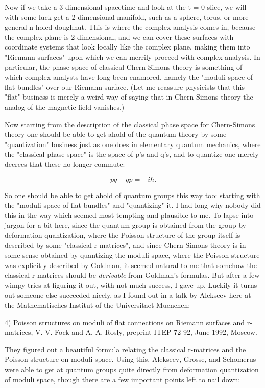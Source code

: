 Now if we take a 3-dimensional spacetime and look at the t = 0
slice, we will with some luck get a 2-dimensional manifold, such
as a sphere, torus, or more general n-holed doughnut.  This is where
the complex analysis comes in, because the complex plane is 2-dimensional,
and we can cover these surfaces with coordinate systems that look
locally like the complex plane, making them into "Riemann surfaces"
upon which we can merrily proceed with complex analysis.  In particular,
the phase space of classical Chern-Simons theory is something of
which complex analysts have long been enamored, namely the "moduli
space of flat bundles" over our Riemann surface.  (Let me reassure
physicists that this "flat" business is merely a weird way of saying
that in Chern-Simons theory the analog of the magnetic field vanishes.)

Now starting from the description of the classical phase space for
Chern-Simons theory one should be able to get ahold of the quantum
theory by some "quantization" business just as one does in elementary
quantum mechanics, where the "classical phase space" is the space
of p's and q's, and to quantize one merely decrees that these no
longer commute:


$$

                        pq - qp = -i \hbar .
$$
    

So one should be able to get ahold of quantum groups this way too:
starting with the "moduli space of flat bundles" and "quantizing" it.
I had long why nobody did this in the way which seemed most tempting
and plausible to me.  To lapse into jargon for a bit here, since the
quantum group is obtained from the group by deformation quantization,
where the Poisson structure of the group itself is described by some
"classical r-matrices", and since Chern-Simons theory is in some sense
obtained by quantizing the moduli space, where the Poisson structure
was explicitly described by Goldman, it seemed natural to me that
somehow the classical r-matrices should be \emph{derivable} from Goldman's
formulas.  But after a few wimpy tries at figuring it out, with
not much success, I gave up.  Luckily it turns out someone else 
succeeded nicely, as I found out in a talk by Alekseev here at the
Mathematisches Institut of the Universitaet Muenchen:

4) Poisson structures on moduli of flat connections on Riemann
surfaces and r-matrices, V. V. Fock and A. A. Rosly, preprint ITEP 72-92,
June 1992, Moscow.

They figured out a beautiful formula relating the classical r-matrices
and the Poisson structure on moduli space.  Using this, Alekseev, 
Grosse, and Schomerus were able to get at quantum groups quite
directly from deformation quantization of moduli space, though
there are a few important points left to nail down:

